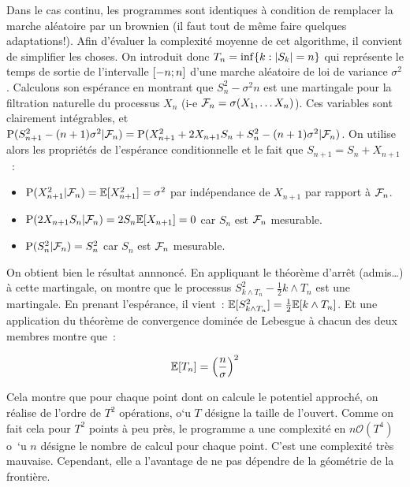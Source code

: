 Dans le cas continu, les programmes sont identiques à condition de remplacer la marche aléatoire par un brownien (il faut tout de même faire
quelques adaptations!).
Afin d'évaluer la complexité moyenne de cet algorithme, il convient de simplifier les choses. On introduit donc
$T_n = \inf\lbrace k : \left|S_k\right| = n\rbrace$ qui représente le temps de sortie de l'intervalle 
$[-n;n]$ d'une marche aléatoire de loi de variance $\sigma^2$. Calculons son 
espérance en montrant que $S_n^2-\sigma^2 n$ est une martingale pour la filtration naturelle du processus $X_n$ 
(i-e $\mathcal{F}_n = \sigma(X_1, \ldots X_n)$). Ces variables sont clairement intégrables, et 
$\textrm{P}(S_{n+1}^2-(n+1)\sigma^2|\mathcal{F}_n) = \textrm{P}(X_{n+1}^2 +2X_{n+1}S_n+S_n^2 - (n+1)\sigma^2|\mathcal{F}_n)$. 
On utilise alors les propriétés de l'espérance conditionnelle et le fait que $S_{n+1}=S_n+X_{n+1}$~:\par
\begin{itemize}
\item{}$\textrm{P}(X_{n+1}^2|\mathcal{F}_n) = \mathbb{E}\lbrack X_{n+1}^2\rbrack = \sigma^2$ par indépendance de $X_{n+1}$ par rapport à 
$\mathcal{F}_n$.
\item{}$\textrm{P}(2X_{n+1}S_n|\mathcal{F}_n) = 2S_n\mathbb{E}\lbrack X_{n+1}\rbrack = 0$ car $S_n$ est $\mathcal{F}_n$ mesurable.
\item{}$\textrm{P}(S_n^2|\mathcal{F}_n) = S_n^2$ car $S_n$ est $\mathcal{F}_n$ mesurable.
\end{itemize}
On obtient bien le résultat annnoncé. En appliquant le théorème d'arrêt (admis\ldots) à cette martingale, on montre que
le processus $S_{k\land T_n}^2 - \frac{1}{2} k\land T_n$ est une martingale. En prenant l'espérance, il vient~:
$\mathbb{E}\lbrack S_{k\land T_n}^2\rbrack=\frac{1}{2}\mathbb{E}\lbrack k\land T_n\rbrack$. Et une application du théorème de convergence dominée de 
Lebesgue à chacun des deux membres montre que~:\par
$$\mathbb{E}\lbrack T_n\rbrack = \left(\dfrac{n}{\sigma}\right)^2$$\par
Cela montre que pour chaque point dont on calcule le potentiel approché, on réalise de l'ordre de $T^2$ 
opérations, o`u $T$ désigne la taille de l'ouvert. Comme on fait cela pour $T^2$ points à peu près, le programme
a une complexité en $n \mathcal{O}(T^4)$ o~`u $n$ désigne le nombre de calcul pour chaque point. C'est une 
complexité très mauvaise. Cependant, elle a l'avantage de ne pas dépendre de la géométrie de la frontière.





